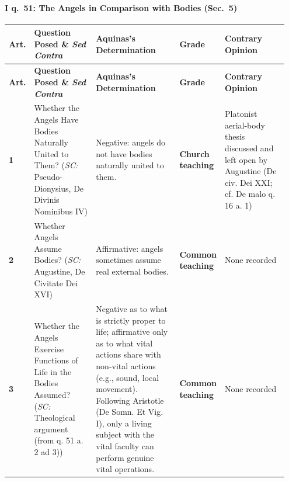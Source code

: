 \paragraph{I q.~51: The Angels in Comparison with Bodies (Sec.~5)}
{\scriptsize
\setlength{\tabcolsep}{2.5pt}
\renewcommand{\arraystretch}{1.15}
\begin{longtable}{>{\raggedright\arraybackslash}p{0.05\linewidth}>{\raggedright\arraybackslash}p{0.23\linewidth}>{\raggedright\arraybackslash}p{0.31\linewidth}>{\raggedright\arraybackslash}p{0.12\linewidth}>{\raggedright\arraybackslash}p{0.24\linewidth}}
\toprule
\textbf{Art.} & \textbf{Question Posed \& \emph{Sed Contra}} & \textbf{Aquinas's Determination} & \textbf{Grade} & \textbf{Contrary Opinion} \\
\midrule
\endfirsthead
\toprule
\textbf{Art.} & \textbf{Question Posed \& \emph{Sed Contra}} & \textbf{Aquinas's Determination} & \textbf{Grade} & \textbf{Contrary Opinion} \\
\midrule
\endhead
\bottomrule
\endfoot
\textbf{1} & Whether the Angels Have Bodies Naturally United to Them? (\emph{SC:} Pseudo-Dionysius, De Divinis Nominibus IV) & Negative: angels do not have bodies naturally united to them. & \textbf{Church teaching} & Platonist aerial-body thesis discussed and left open by Augustine (De civ. Dei XXI; cf. De malo q. 16 a. 1) \\
\addlinespace[1.5pt]
\textbf{2} & Whether Angels Assume Bodies? (\emph{SC:} Augustine, De Civitate Dei XVI) & Affirmative: angels sometimes assume real external bodies. & \textbf{Common teaching} & None recorded \\
\addlinespace[1.5pt]
\textbf{3} & Whether the Angels Exercise Functions of Life in the Bodies Assumed? (\emph{SC:} Theological argument (from q. 51 a. 2 ad 3)) & Negative as to what is strictly proper to life; affirmative only as to what vital actions share with non-vital actions (e.g., sound, local movement). Following Aristotle (De Somn. Et Vig. I), only a living subject with the vital faculty can perform genuine vital operations. & \textbf{Common teaching} & None recorded \\
\end{longtable}
}

